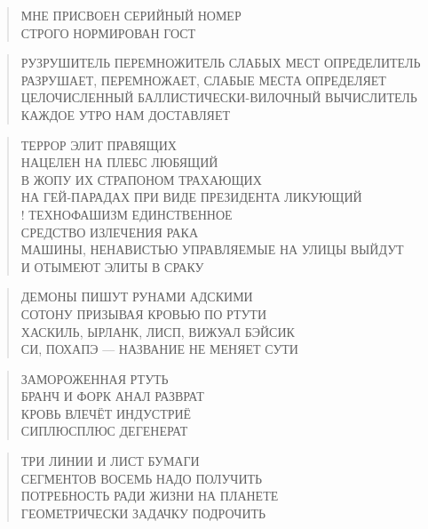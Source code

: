 \poemtitle{***}
\begin{verse}
МНЕ ПРИСВОЕН СЕРИЙНЫЙ НОМЕР\\
СТРОГО НОРМИРОВАН ГОСТ
\end{verse}

\poemtitle{***}
\begin{verse}
РУЗРУШИТЕЛЬ ПЕРЕМНОЖИТЕЛЬ СЛАБЫХ МЕСТ ОПРЕДЕЛИТЕЛЬ\\
РАЗРУШАЕТ, ПЕРЕМНОЖАЕТ, СЛАБЫЕ МЕСТА ОПРЕДЕЛЯЕТ\\
ЦЕЛОЧИСЛЕННЫЙ БАЛЛИСТИЧЕСКИ-ВИЛОЧНЫЙ ВЫЧИСЛИТЕЛЬ\\
КАЖДОЕ УТРО НАМ ДОСТАВЛЯЕТ
\end{verse}

\poemtitle{***}
\begin{verse}
ТЕРРОР ЭЛИТ ПРАВЯЩИХ\\
НАЦЕЛЕН НА ПЛЕБС ЛЮБЯЩИЙ\\
В ЖОПУ ИХ СТРАПОНОМ ТРАХАЮЩИХ\\
НА ГЕЙ-ПАРАДАХ ПРИ ВИДЕ ПРЕЗИДЕНТА ЛИКУЮЩИЙ\\!
ТЕХНОФАШИЗМ ЕДИНСТВЕННОЕ\\
СРЕДСТВО ИЗЛЕЧЕНИЯ РАКА\\
МАШИНЫ, НЕНАВИСТЬЮ УПРАВЛЯЕМЫЕ НА УЛИЦЫ ВЫЙДУТ\\
И ОТЫМЕЮТ ЭЛИТЫ В СРАКУ
\end{verse}

\poemtitle{***}
\begin{verse}
ДЕМОНЫ ПИШУТ РУНАМИ АДСКИМИ\\
СОТОНУ ПРИЗЫВАЯ КРОВЬЮ ПО РТУТИ\\
ХАСКИЛЬ, ЫРЛАНК, ЛИСП, ВИЖУАЛ БЭЙСИК\\
СИ, ПОХАПЭ — НАЗВАНИЕ НЕ МЕНЯЕТ СУТИ
\end{verse}

\poemtitle{***}
\begin{verse}
ЗАМОРОЖЕННАЯ РТУТЬ\\
БРАНЧ И ФОРК АНАЛ РАЗВРАТ\\
КРОВЬ ВЛЕЧЁТ ИНДУСТРИЁ\\
СИПЛЮСПЛЮС ДЕГЕНЕРАТ
\end{verse}

\poemtitle{***}
\begin{verse}
ТРИ ЛИНИИ И ЛИСТ БУМАГИ\\
СЕГМЕНТОВ ВОСЕМЬ НАДО ПОЛУЧИТЬ\\
ПОТРЕБНОСТЬ РАДИ ЖИЗНИ НА ПЛАНЕТЕ\\
ГЕОМЕТРИЧЕСКИ ЗАДАЧКУ ПОДРОЧИТЬ
\end{verse}


